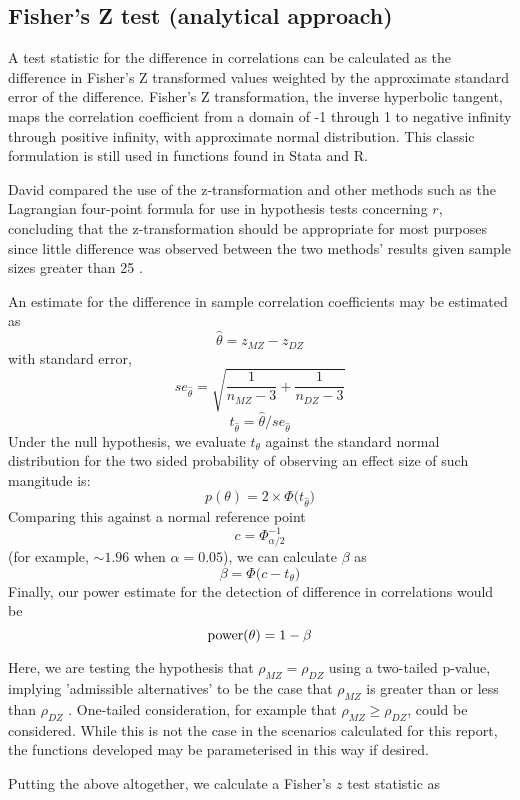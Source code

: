 \subsection{Fisher's Z test (analytical approach)}
A test statistic for the difference in correlations can be calculated as the difference in Fisher's Z transformed values weighted by the approximate standard error of the difference.  Fisher's Z transformation, the inverse hyperbolic tangent, maps the correlation coefficient from a domain of -1 through 1 to negative infinity through positive infinity, with approximate normal distribution.  This classic formulation is still used in functions found in Stata and R.

David compared the use of the z-transformation and other methods such as the Lagrangian four-point formula for use in hypothesis tests concerning $r$, concluding that the z-transformation should be appropriate for most purposes since little difference was observed between the two methods' results given sample sizes greater than 25 \cite{David1938}.

An estimate for the difference in sample correlation coefficients may be estimated as \cite{David1938}
$$\hat{\theta} = z_{MZ} - z_{DZ}$$
with standard error,
$$se_\hat{\theta}  = \sqrt{\frac{1}{n_{MZ}-3}+\frac{1}{n_{DZ}-3}} $$
$$t_\hat{\theta}   = \hat{\theta} / se_\hat{\theta}               $$ 
Under the null hypothesis, we evaluate \(t_\theta\) against the standard normal distribution for the two sided probability of observing an effect size of such mangitude is:
$$p(\theta)  =  2 \times \Phi \bigg(t_{\hat{\theta}} \bigg)$$
Comparing this against a normal reference point
$$ c   =  \Phi_{\alpha/2}^{-1}$$
 (for example, $\sim 1.96$ when $\alpha = 0.05$), we can calculate $\beta$ as
$$\beta = \Phi \bigg( c - t_\theta \bigg)$$
Finally, our power estimate for the detection of difference in correlations would be
$$\operatorname{power}(\theta) = 1 - \beta$$

Here, we are testing the hypothesis that $\rho_{MZ} = \rho_{DZ}$ using a two-tailed p-value, implying 'admissible alternatives' to be the case that $\rho_{MZ}$ is greater than or less than $\rho_{DZ}$ \cite{David1938}.  One-tailed consideration, for example that $\rho_{MZ} \geq \rho_{DZ}$, could be considered.  While this is not the case in the scenarios calculated for this report, the functions developed may be parameterised in this way if desired.

Putting the above altogether, we calculate a Fisher's $z$ test statistic as 

